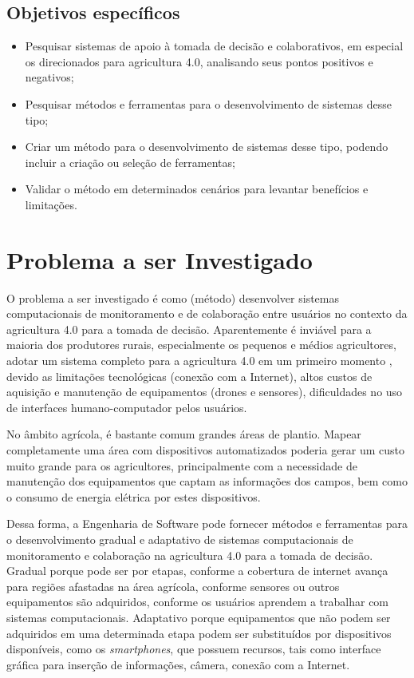 \documentclass[12pt]{article}
\begin{document}
\subsection{Objetivos específicos}
\label{subsec:objetivos_especificos}

\begin{itemize}
	\item Pesquisar sistemas de apoio à tomada de decisão e colaborativos, em especial os direcionados para agricultura 4.0, analisando seus pontos positivos e negativos;
	\item Pesquisar métodos e ferramentas para o desenvolvimento de sistemas desse tipo;
	\item Criar um método para o desenvolvimento de sistemas desse tipo, podendo incluir a criação ou seleção de ferramentas;
	\item Validar o método em determinados cenários para levantar benefícios e limitações.
\end{itemize}

\section{Problema a ser Investigado}
\label{sec:problema_investigado}

O problema a ser investigado é como (método) desenvolver sistemas computacionais de monitoramento e de colaboração entre usuários no contexto da agricultura 4.0 para a tomada de decisão. Aparentemente é inviável para a maioria dos produtores rurais, especialmente os pequenos e médios agricultores, adotar um sistema completo para a agricultura 4.0 em um primeiro momento \cite{Rose:2019}, devido as limitações tecnológicas (conexão com a Internet), altos custos de aquisição e manutenção de equipamentos (drones e sensores), dificuldades no uso de interfaces humano-computador pelos usuários.

No âmbito agrícola, é bastante comum grandes áreas de plantio. Mapear completamente uma área com dispositivos automatizados poderia gerar um custo muito grande para os agricultores, principalmente com a necessidade de manutenção dos equipamentos que captam as informações dos campos, bem como o consumo de energia elétrica por estes dispositivos.

Dessa forma, a Engenharia de Software pode fornecer métodos e ferramentas para o desenvolvimento gradual e adaptativo de sistemas computacionais de monitoramento e colaboração na agricultura 4.0 para a tomada de decisão. Gradual porque pode ser por etapas, conforme a cobertura de internet avança para regiões afastadas na área agrícola, conforme sensores ou outros equipamentos são adquiridos, conforme os usuários aprendem a trabalhar com sistemas computacionais. Adaptativo porque equipamentos que não podem ser adquiridos em uma determinada etapa podem ser substituídos por dispositivos disponíveis, como os \textit{smartphones}, que possuem recursos, tais como interface gráfica para inserção de informações, câmera, conexão com a Internet.
\end{document}
